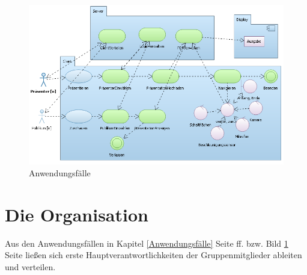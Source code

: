 \begin{figure}[!htb]
	\centering
	\includegraphics[angle=0,width=14cm]{ProjektOrganisation/Bilder/Anwendungsfaelle.png}
	\caption{Anwendungsfälle}
	\label{BildAnwendungsfaelle}
\end{figure}

\section{Die Organisation}
Aus den Anwendungsfällen in Kapitel \ref{Anwendungsfälle} Seite \pageref{Anwendungsfälle} ff. bzw. Bild \ref{BildAnwendungsfaelle} Seite \pageref{BildAnwendungsfaelle} ließen sich erste Hauptverantwortlichkeiten der Gruppenmitglieder ableiten und verteilen.\\

